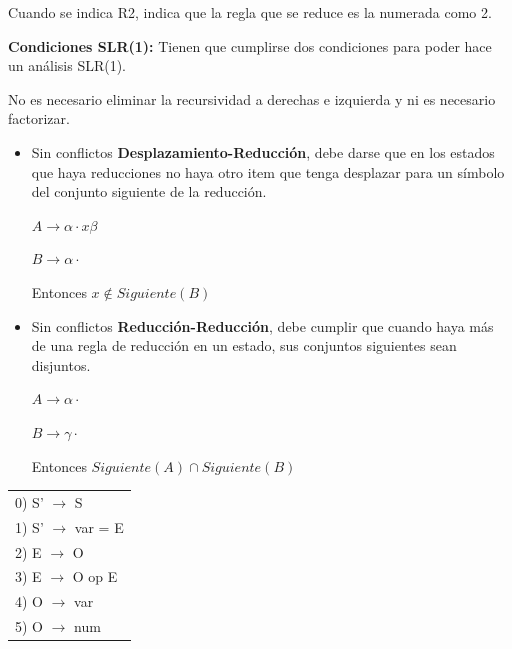 \documentclass[12pt, twoside, openright]{report} %
\begin{document}
Cuando se indica R2, indica que la regla que se reduce es la numerada como 2.

\textbf{Condiciones SLR(1):}
Tienen que cumplirse dos condiciones para poder hace un análisis SLR(1).

No es necesario eliminar la recursividad a derechas e izquierda y ni es necesario factorizar.

\begin{itemize}
	\item Sin conflictos \textbf{Desplazamiento-Reducción}, debe darse que en los estados que haya reducciones no haya otro item que tenga desplazar para un símbolo del conjunto siguiente de la reducción.

	      $A \rightarrow \alpha \cdot x \beta$

	      $B \rightarrow \alpha \cdot$

	      Entonces $x \notin Siguiente(B)$
	\item Sin conflictos \textbf{Reducción-Reducción}, debe cumplir que cuando haya más de una regla de reducción en un estado, sus conjuntos siguientes sean disjuntos.

	      $A \rightarrow \alpha \cdot $

	      $B \rightarrow \gamma \cdot$

	      Entonces $Siguiente(A) \cap Siguiente(B)$
\end{itemize}

\begin{table}[H]
	\centering
	\begin{tabular}{l}
		0) S' $\rightarrow$ S       \\
		1) S' $\rightarrow$ var = E \\
		2) E $\rightarrow$ O        \\
		3) E $\rightarrow$ O op E   \\
		4) O $\rightarrow$ var      \\
		5) O $\rightarrow$ num
	\end{tabular}
\end{table}
\end{document}
